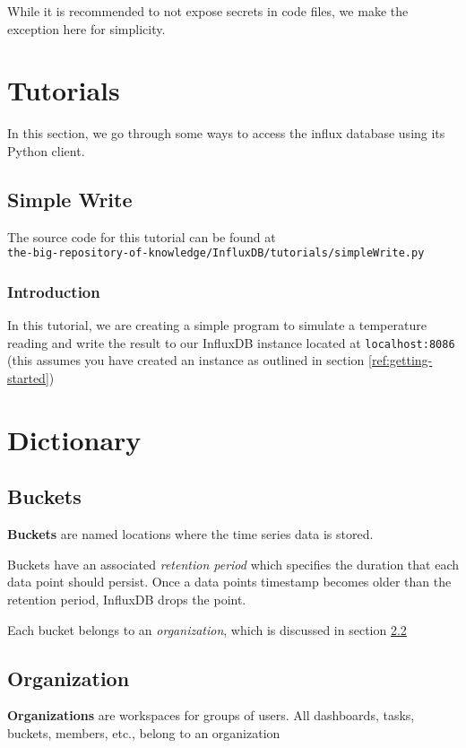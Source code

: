 \documentclass{article}
\begin{document}
While it is recommended to not expose secrets in code files, we make the exception here for simplicity.

\section{Tutorials}

In this section, we go through some ways to access the influx database using its Python client.

\subsection{Simple Write}

The source code for this tutorial can be found at \\ \verb|the-big-repository-of-knowledge/InfluxDB/tutorials/simpleWrite.py|

\subsubsection{Introduction}

In this tutorial, we are creating a simple program to simulate a temperature reading and write the result to our InfluxDB instance located at \verb|localhost:8086| (this assumes you have created an instance as outlined in section \ref{ref:getting-started})

\section{Dictionary}

\subsection{Buckets}\label{ref:bucket}

\textbf{Buckets} are named locations where the time series data is stored.

Buckets have an associated \textit{retention period} which specifies the duration that each data point should persist. Once a data points timestamp becomes older than the retention period, InfluxDB drops the point.

Each bucket belongs to an \textit{organization}, which is discussed in section \ref{ref:organization}

\subsection{Organization}\label{ref:organization}

\textbf{Organizations} are workspaces for groups of users. All dashboards, tasks, buckets, members, etc., belong to an organization
\end{document}
